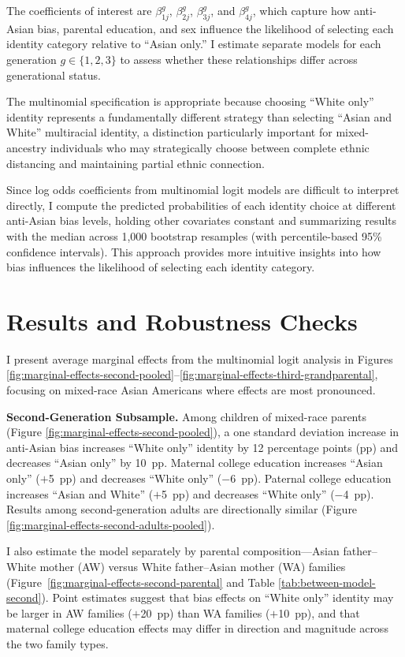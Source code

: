 The coefficients of interest are $\beta_{1j}^g$, $\beta_{2j}^g$, $\beta_{3j}^g$, and $\beta_{4j}^g$, which capture how anti-Asian bias, parental education, and sex influence the likelihood of selecting each identity category relative to ``Asian only.'' I estimate separate models for each generation $g \in \{1,2,3\}$ to assess whether these relationships differ across generational status.

The multinomial specification is appropriate because choosing ``White only'' identity represents a fundamentally different strategy than selecting ``Asian and White'' multiracial identity, a distinction particularly important for mixed-ancestry individuals who may strategically choose between complete ethnic distancing and maintaining partial ethnic connection.

Since log odds coefficients from multinomial logit models are difficult to interpret directly, I compute the predicted probabilities of each identity choice at different anti-Asian bias levels, holding other covariates constant and summarizing results with the median across 1{,}000 bootstrap resamples (with percentile-based 95\% confidence intervals). This approach provides more intuitive insights into how bias influences the likelihood of selecting each identity category.

\section{Results and Robustness Checks}\label{sec:results}

I present average marginal effects from the multinomial logit analysis in Figures \ref{fig:marginal-effects-second-pooled}--\ref{fig:marginal-effects-third-grandparental}, focusing on mixed-race Asian Americans where effects are most pronounced.

\textbf{Second-Generation Subsample.} Among children of mixed-race parents (Figure \ref{fig:marginal-effects-second-pooled}), a one standard deviation increase in anti-Asian bias increases ``White only'' identity by 12 percentage points (pp) and decreases ``Asian only'' by 10~pp. Maternal college education increases ``Asian only'' ($+$5~pp) and decreases ``White only'' ($-$6~pp). Paternal college education increases ``Asian and White'' ($+$5~pp) and decreases ``White only'' ($-$4~pp). Results among second-generation adults are directionally similar (Figure \ref{fig:marginal-effects-second-adults-pooled}).

I also estimate the model separately by parental composition---Asian father--White mother (AW) versus White father--Asian mother (WA) families (Figure~\ref{fig:marginal-effects-second-parental} and Table \ref{tab:between-model-second}). Point estimates suggest that bias effects on ``White only'' identity may be larger in AW families ($+$20~pp) than WA families ($+$10~pp), and that maternal college education effects may differ in direction and magnitude across the two family types. 

